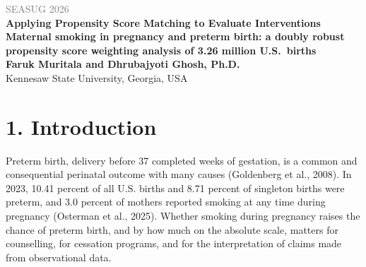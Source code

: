 \documentclass[11pt,letterpaper]{article}
\begin{document}
\begin{center}
{\small\textcolor{gray}{SEASUG 2026}}\\[4pt]
{\LARGE\bfseries\sffamily\color{navy} Applying Propensity Score Matching to Evaluate Interventions}\\[6pt]
{\large\bfseries Maternal smoking in pregnancy and preterm birth: a doubly robust propensity score weighting analysis of 3.26 million U.S.\ births}\\[10pt]
{\bfseries Faruk Muritala and Dhrubajyoti Ghosh, Ph.D.}\\[2pt]
Kennesaw State University, Georgia, USA
\end{center}
\begin{abstract}
\noindent Smoking during pregnancy is an established risk factor for preterm birth, yet large U.S. analyses mainly report adjusted odds ratios from regression. The effect of smoking during pregnancy on preterm birth (under 37 weeks) was estimated on the absolute risk scale in 3,259,496 singleton live births from the 2023 U.S. Natality Public Use File (97,187 to mothers who smoked), using augmented inverse probability of treatment weighting (AIPTW) with ten confounders selected from a causal diagram that documents the evidence for each arrow. The crude risk difference of 5.60 percentage points became 3.26 (95\% CI 2.47 to 4.04) after AIPTW adjustment, corresponding to preterm risks of 11.6\% if all mothers smoked and 8.4\% if none did (risk ratio 1.39). Estimates ranged from 3.02 to 3.65 points across propensity score handling rules and covariate specifications. Overlap was limited (41\% of non-smokers had an estimated probability of smoking below 0.01), and the E-value was 2.12. The estimates rest on the stated causal assumptions and on self-reported smoking. R code with a fixed seed (1234) accompanies the paper.

\smallskip\noindent\textbf{Keywords:} causal inference, propensity score weighting, doubly robust estimation, AIPTW, preterm birth, maternal smoking, birth certificate data, E-value
\end{abstract}

\section*{1. Introduction}

Preterm birth, delivery before 37 completed weeks of gestation, is a common and consequential perinatal outcome with many causes (Goldenberg et al., 2008). In 2023, 10.41 percent of all U.S. births and 8.71 percent of singleton births were preterm, and 3.0 percent of mothers reported smoking at any time during pregnancy (Osterman et al., 2025). Whether smoking during pregnancy raises the chance of preterm birth, and by how much on the absolute scale, matters for counselling, for cessation programs, and for the interpretation of claims made from observational data.
\end{document}
